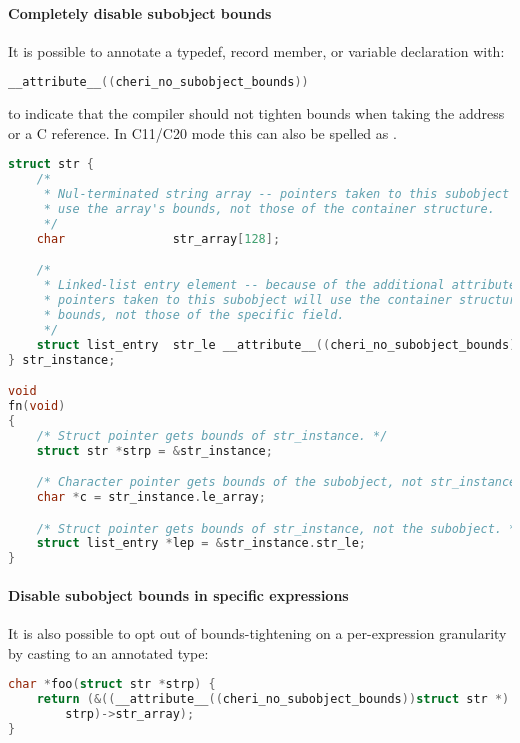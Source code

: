 \documentclass[12pt,twoside,openright,a4paper]{article}
\newcommand{\ccode}[1]{{\small\ttfamily{#1}}}
\newcommand{\cxxcode}[1]{{\ccode{#1}}}
\newcommand*{\cpp}[1][]{C\textsmaller[2]{\nolinebreak[4]\hspace{-.05em}\raisebox{.45ex}{\textbf{++}}}}
\begin{document}
\paragraph{Completely disable subobject bounds} It is possible to annotate a typedef, record member,
or variable declaration with:

\begin{lstlisting}[language={C}]
__attribute__((cheri_no_subobject_bounds))
\end{lstlisting}

\noindent
to indicate that the compiler should not tighten bounds when taking the address or a \cpp{} reference. In \cpp{}11/C20 mode this can also be spelled as \cxxcode{[[cheri::no\_subobject\_bounds]]}.

\begin{lstlisting}[language={C}]
struct str {
    /*
     * Nul-terminated string array -- pointers taken to this subobject will
     * use the array's bounds, not those of the container structure.
     */
    char               str_array[128];

    /*
     * Linked-list entry element -- because of the additional attribute,
     * pointers taken to this subobject will use the container structure's
     * bounds, not those of the specific field.
     */
    struct list_entry  str_le __attribute__((cheri_no_subobject_bounds));
} str_instance;

void
fn(void)
{
    /* Struct pointer gets bounds of str_instance. */
    struct str *strp = &str_instance;

    /* Character pointer gets bounds of the subobject, not str_instance. */
    char *c = str_instance.le_array;

    /* Struct pointer gets bounds of str_instance, not the subobject. */
    struct list_entry *lep = &str_instance.str_le;
}
\end{lstlisting}

\paragraph{Disable subobject bounds in specific expressions}
It is also possible to opt out of bounds-tightening on a per-expression
granularity by casting to an annotated type:

\begin{lstlisting}[language={C}]
char *foo(struct str *strp) {
    return (&((__attribute__((cheri_no_subobject_bounds))struct str *)
        strp)->str_array);
}
\end{lstlisting}
\end{document}

